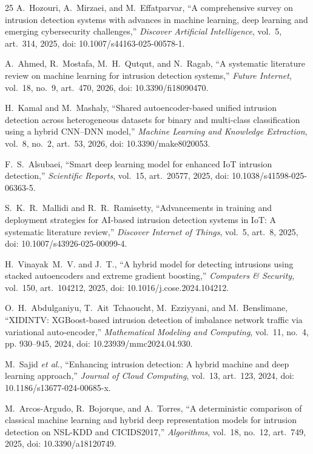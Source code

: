 \documentclass[journal]{IEEEtran}
\begin{document}
\begin{thebibliography}{25}
A.~Hozouri, A.~Mirzaei, and M.~Effatparvar, ``A comprehensive survey on intrusion detection systems with advances in machine learning, deep learning and emerging cybersecurity challenges,'' \textit{Discover Artificial Intelligence}, vol.~5, art.~314, 2025, doi: 10.1007/s44163-025-00578-1.

A.~Ahmed, R.~Mostafa, M.~H.~Qutqut, and N.~Ragab, ``A systematic literature review on machine learning for intrusion detection systems,'' \textit{Future Internet}, vol.~18, no.~9, art.~470, 2026, doi: 10.3390/fi18090470.

H.~Kamal and M.~Mashaly, ``Shared autoencoder-based unified intrusion detection across heterogeneous datasets for binary and multi-class classification using a hybrid CNN--DNN model,'' \textit{Machine Learning and Knowledge Extraction}, vol.~8, no.~2, art.~53, 2026, doi: 10.3390/make8020053.

F.~S.~Alsubaei, ``Smart deep learning model for enhanced IoT intrusion detection,'' \textit{Scientific Reports}, vol.~15, art.~20577, 2025, doi: 10.1038/s41598-025-06363-5.

S.~K.~R.~Mallidi and R.~R.~Ramisetty, ``Advancements in training and deployment strategies for AI-based intrusion detection systems in IoT: A systematic literature review,'' \textit{Discover Internet of Things}, vol.~5, art.~8, 2025, doi: 10.1007/s43926-025-00099-4.

H.~Vinayak~M.~V. and J.~T., ``A hybrid model for detecting intrusions using stacked autoencoders and extreme gradient boosting,'' \textit{Computers \& Security}, vol.~150, art.~104212, 2025, doi: 10.1016/j.cose.2024.104212.

O.~H.~Abdulganiyu, T.~Ait~Tchaoucht, M.~Ezziyyani, and M.~Benslimane, ``XIDINTV: XGBoost-based intrusion detection of imbalance network traffic via variational auto-encoder,'' \textit{Mathematical Modeling and Computing}, vol.~11, no.~4, pp. 930--945, 2024, doi: 10.23939/mmc2024.04.930.

M.~Sajid \textit{et al.}, ``Enhancing intrusion detection: A hybrid machine and deep learning approach,'' \textit{Journal of Cloud Computing}, vol.~13, art.~123, 2024, doi: 10.1186/s13677-024-00685-x.

M.~Arcos-Argudo, R.~Bojorque, and A.~Torres, ``A deterministic comparison of classical machine learning and hybrid deep representation models for intrusion detection on NSL-KDD and CICIDS2017,'' \textit{Algorithms}, vol.~18, no.~12, art.~749, 2025, doi: 10.3390/a18120749.


\end{thebibliography}
\end{document}
